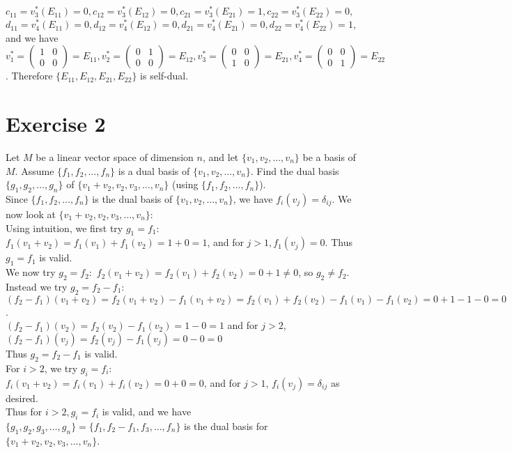 \documentclass[12pt,a4paper]{article}
\theoremstyle{plain}
\theoremstyle{remark}
\theoremstyle{definition}
\begin{document}
	$c_{11} = v_3^*(E_{11}) = 0, c_{12} = v_3^*(E_{12}) = 0, c_{21} = v_3^*(E_{21}) = 1, c_{22} = v_3^*(E_{22}) = 0,$\\
	$d_{11} = v_4^*(E_{11}) = 0, d_{12} = v_4^*(E_{12}) = 0, d_{21} = v_4^*(E_{21}) = 0, d_{22} = v_4^*(E_{22}) = 1$,\\
	and we have\\
	$v_1^* = \begin{pmatrix}
	1 & 0 \\ 0 & 0
	\end{pmatrix} = E_{11}
	, v_2^* = \begin{pmatrix}
	0 & 1 \\ 0 & 0
	\end{pmatrix}
	= E_{12}, v_3^* = \begin{pmatrix}
	0 & 0 \\ 1 & 0
	\end{pmatrix}
	= E_{21}, v_4^* = \begin{pmatrix}
	0 & 0 \\ 0 & 1
	\end{pmatrix}
	= E_{22}$.
	Therefore $\{E_{11},E_{12},E_{21},E_{22}\}$ is self-dual.
	 
	
\pagebreak
\section*{Exercise 2}
	Let $M$ be a linear vector space of dimension $n$, and let $\{v_1,v_2,\ldots,v_n\}$ be a basis of $M$. Assume $\{f_1,f_2,\ldots,f_n\}$ is a dual basis of $\{v_1,v_2,\ldots,v_n\}$. Find the dual basis $\{g_1,g_2,\ldots,g_n\}$ of $\{v_1 + v_2, v_2, v_3,\ldots,v_n\}$ (using $\{f_1,f_2,\ldots,f_n\}$).\\
	
	Since $\{f_1,f_2,\ldots,f_n\}$ is the dual basis of $\{v_1,v_2,\ldots,v_n\}$, we have $f_i(v_j) = \delta_{ij}$. We now look at $\{v_1+v_2,v_2,v_3,\ldots,v_n\}$:\\
	Using intuition, we first try $g_1 = f_1$: $f_1(v_1+v_2) = f_1(v_1) + f_1(v_2) = 1 + 0 = 1$, and for $j > 1, f_1(v_j) = 0$. Thus $g_1 = f_1$ is valid.\\
	We now try $g_2 = f_2:$ $f_2(v_1 + v_2) = f_2(v_1) + f_2(v_2) = 0 + 1 \ne 0$, so $g_2 \ne f_2$. Instead we try $g_2 = f_2 - f_1$:\\
	$(f_2-f_1)(v_1 + v_2) = f_2(v_1 + v_2) - f_1(v_1 + v_2) = f_2(v_1) + f_2(v_2) - f_1(v_1) - f_1(v_2) = 0 + 1 - 1 - 0 = 0$.\\
	$(f_2 - f_1)(v_2) = f_2(v_2) - f_1(v_2) = 1 - 0 = 1$ and for $j > 2$, $(f_2 - f_1)(v_j) = f_2(v_j) - f_1(v_j) = 0 - 0 = 0$\\
	Thus $g_2 = f_2 - f_1$ is valid.\\
	For $i > 2$, we try $g_i = f_i$:\\
	$f_i(v_1 + v_2) = f_i(v_1) + f_i(v_2) = 0 + 0 = 0$, and for $j > 1$, $f_i(v_j) = \delta_{ij}$ as desired.\\
	Thus for $i > 2, g_i = f_i$ is valid, and we have\\
	$\{g_1,g_2,g_3,\ldots,g_n\} = \{f_1,f_2-f_1,f_3,\ldots,f_n\}$ is the dual basis for $\{v_1 + v_2, v_2,v_3,\ldots,v_n\}$.
	
\end{document}
